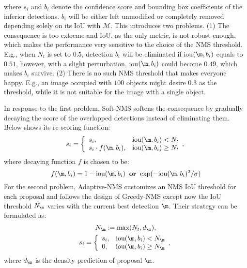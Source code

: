 \documentclass[sigconf]{acmart}
\begin{document}
where $s_i$ and $b_i$ denote the confidence score and bounding box coefficients of the inferior detections. $b_i$ will be either left unmodified or completely removed depending solely on its IoU with $\mathcal{M}$. This introduces two problems. (1) The consequence is too extreme and IoU, as the only metric, is not robust enough, which makes the performance very sensitive to the choice of the NMS threshold. E.g., when $N_t$ is set to $0.5$, detection $b_i$ will be eliminated if iou$(\m, b_i)$ equals to $0.51$, however, with a slight perturbation, iou$(\m, b_i)$ could become $0.49$, which makes $b_i$ survive. (2) There is no such NMS threshold that makes everyone happy. E.g., an image occupied with $100$ objects might desire $0.3$ as the threshold, while it is not suitable for the image with a single object.

In response to the first problem, Soft-NMS softens the consequence by gradually decaying the score of the overlapped detections instead of eliminating them. Below shows its re-scoring function:
\begin{equation}
    s_i=\left\{
        \begin{array}{ll}
            s_i,
            &\text{iou}(\m, b_i) < N_t 
            \\
            s_i \cdot f(\m, b_i),
            &\text{iou}(\m, b_i) \geq N_t
        \end{array}
        ,
        \right.
    \label{eq:soft-nms}
\end{equation} 
where decaying function $f$ is chosen to be:
\begin{equation}
    f(\m, b_i) = 
    1 - \text{iou}(\m, b_i)
    \;\; \textbf{or} \;\;
    \text{exp}(-\text{iou}(\m, b_i)^2 / \sigma)
    \label{eq:soft-nms-f}
\end{equation} 
For the second problem, Adaptive-NMS customizes an NMS IoU threshold for each proposal and follows the design of Greedy-NMS except now the IoU threshold $N_{\m}$ varies with the current best detection $\m$. Their strategy can be formulated as:
\begin{gather}
    N_\m := \text{max}(N_t, d_\m),\\
    s_i=\left\{
        \begin{array}{ll}
            s_i,
            &\text{iou}(\m, b_i) < N_\m
            \\
            0,
            &\text{iou}(\m, b_i) \geq N_\m
        \end{array}
        ,
        \right.
    \label{eq:adaptive-nms-old}
\end{gather} 
where $d_\m$ is the density prediction of proposal $\m$.
\end{document}
